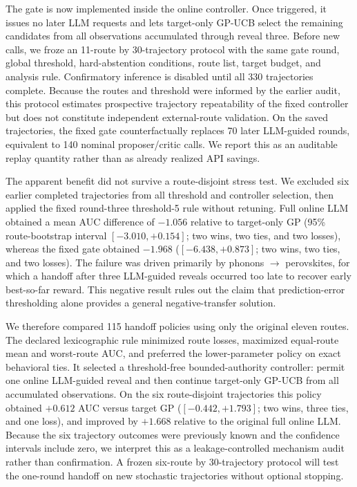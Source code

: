 The gate is now implemented inside the online controller. Once triggered, it
issues no later LLM requests and lets target-only GP-UCB select the remaining
candidates from all observations accumulated through reveal three. Before new
calls, we froze an 11-route by 30-trajectory protocol with the same gate round,
global threshold, hard-abstention conditions, route list, target budget, and
analysis rule. Confirmatory inference is disabled until all 330 trajectories
complete. Because the routes and threshold were informed by the earlier audit,
this protocol estimates prospective trajectory repeatability of the fixed
controller but does not constitute independent external-route validation.
On the saved trajectories, the fixed gate counterfactually replaces 70 later
LLM-guided rounds, equivalent to 140 nominal proposer/critic calls. We report
this as an auditable replay quantity rather than as already realized API
savings.

The apparent benefit did not survive a route-disjoint stress test. We excluded
six earlier completed trajectories from all threshold and controller selection,
then applied the fixed round-three threshold-5 rule without retuning. Full
online LLM obtained a mean AUC difference of $-1.056$ relative to target-only
GP (95\% route-bootstrap interval $[-3.010,+0.154]$; two wins, two ties, and two
losses), whereas the fixed gate obtained $-1.968$
($[-6.438,+0.873]$; two wins, two ties, and two losses). The failure was driven
primarily by phonons $\rightarrow$ perovskites, for which a handoff after three
LLM-guided reveals occurred too late to recover early best-so-far reward. This
negative result rules out the claim that prediction-error thresholding alone
provides a general negative-transfer solution.

We therefore compared 115 handoff policies using only the original eleven
routes. The declared lexicographic rule minimized route losses, maximized
equal-route mean and worst-route AUC, and preferred the lower-parameter policy
on exact behavioral ties. It selected a threshold-free bounded-authority
controller: permit one online LLM-guided reveal and then continue target-only
GP-UCB from all accumulated observations. On the six route-disjoint
trajectories this policy obtained $+0.612$ AUC versus target GP
($[-0.442,+1.793]$; two wins, three ties, and one loss), and improved by
$+1.668$ relative to the original full online LLM. Because the six trajectory
outcomes were previously known and the confidence intervals include zero, we
interpret this as a leakage-controlled mechanism audit rather than
confirmation. A frozen six-route by 30-trajectory protocol will test the
one-round handoff on new stochastic trajectories without optional stopping.

